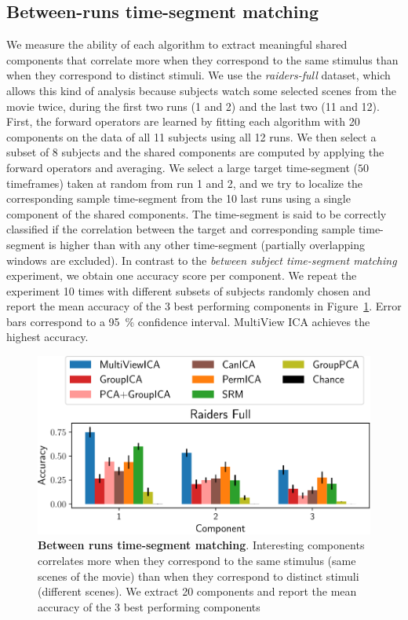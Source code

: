 \subsection{Between-runs time-segment matching}
\label{app_spatialmaps}
We measure the ability of each algorithm to extract meaningful shared components that correlate more when they correspond to the same stimulus than when they correspond to distinct stimuli. We use the \emph{raiders-full} dataset, which allows this kind of analysis because subjects watch some selected scenes from the movie twice, during the first two runs (1 and 2) and the last two (11 and 12).
%
First, the forward operators are learned by fitting each algorithm with 20 components on the data of all 11 subjects using all 12 runs. We then select a subset of 8 subjects and the shared components are computed by applying the forward operators and averaging.
%
We select a large target time-segment ($50$
timeframes) taken at random from run 1 and 2, and we try to localize the corresponding sample time-segment from the 10 last runs using a single component of the shared components.
%
The time-segment is said to be
correctly classified if the correlation between the target and corresponding sample
time-segment is higher than with any other time-segment (partially overlapping windows are excluded).
%
In contrast to the \emph{between subject time-segment matching} experiment, we obtain one accuracy score per component.
%
We repeat the experiment 10 times with different subsets of subjects randomly chosen and report the mean accuracy of the 3 best performing components in Figure~\ref{fig:swetha}. Error bars correspond to a 95~\% confidence interval.
%
MultiView ICA achieves the highest accuracy.

\begin{figure}
  \centering
  \includegraphics[width=\textwidth]{figures/mvica/swetha_exp_full_fit.pdf}
  \caption{\textbf{Between runs time-segment matching}. Interesting components correlates more when they correspond to the same stimulus (same scenes of the movie) than when they correspond to distinct stimuli (different scenes).
  We extract 20 components and report the mean accuracy of the 3 best performing components}
  \label{fig:swetha}
\end{figure}


